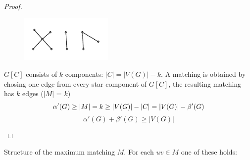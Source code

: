 \documentclass[notitlepage, 12pt]{article}
\begin{document}
\begin{proof}
\begin{itemize}
  \begin{figure}[h]
    \includegraphics[width=0.4\textwidth]{gallois-part-2-star.pdf}
    \centering
  \end{figure}
  $G[C]$ consists of $k$ components: $|C| = |V(G)| - k$. A matching is obtained
  by chosing one edge from every star component of $G[C]$, the resulting matching
  has $k$ edges ($|M|$ = $k$)
  \begin{equation*}
    \alpha'(G) \geq |M| = k \geq |V(G)| -|C| = |V(G)| - \beta'(G)\\
  \end{equation*}
  \begin{equation*}
    \alpha'(G) + \beta'(G) \geq |V(G)|
  \end{equation*}
\end{itemize}
\end{proof}
\newpage
Structure of the maximum matching $M$. For each $uv \in M$ one of these holds:
\end{document}
